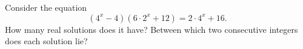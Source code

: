 Consider the equation
\[
\left(4^x-4\right)\left(6\cdot2^x+12\right)=2\cdot4^x+16 .
\]
How many real solutions does it have? Between which two consecutive integers does each solution lie?
